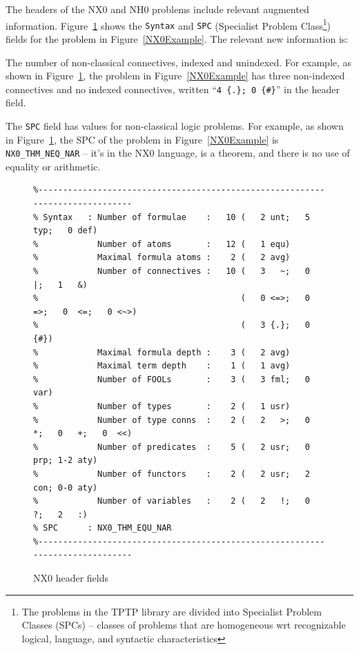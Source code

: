\documentclass{ceurart}
\newenvironment{packed_itemize}{
\vspace*{-0.5em}
\begin{itemize}
\setlength{\partopsep}{0pt}
\setlength{\itemsep}{1pt}
\setlength{\parskip}{0pt}
\setlength{\parsep}{0pt}
}{\end{itemize}}
\begin{document}
The headers of the NX0 and NH0 problems include relevant augmented information.
Figure~\ref{NX0Header} shows the {\tt Syntax} and {\tt SPC} (Specialist Problem Class\footnote{%
The problems in the TPTP library are divided into Specialist Problem Classes (SPCs) – classes 
of problems that are homogeneous wrt recognizable logical, language, and syntactic
characteristics}) fields for the problem in Figure~\ref{NX0Example}.
The relevant new information is:
\begin{packed_itemize}
\item The number of non-classical connectives, indexed and unindexed.
      For example, as shown in Figure~\ref{NX0Header}, the problem in Figure~\ref{NX0Example} 
      has three non-indexed connectives and no indexed connectives, written 
      ``{\tt 4 \{.\};   0 \{\#\}}'' in the header field.
\item The {\tt SPC} field has values for non-classical logic problems. 
      For example, as shown in Figure~\ref{NX0Header}, the SPC of the problem in 
      Figure~\ref{NX0Example} is {\tt NX0\_THM\_NEQ\_NAR} -- it's in the NX0 language, is a 
      theorem, and there is no use of equality or arithmetic.
\end{packed_itemize}

\begin{figure}[h!]
\small
{}
\begin{verbatim}
%------------------------------------------------------------------------------
% Syntax   : Number of formulae    :   10 (   2 unt;   5 typ;   0 def)
%            Number of atoms       :   12 (   1 equ)
%            Maximal formula atoms :    2 (   2 avg)
%            Number of connectives :   10 (   3   ~;   0   |;   1   &)
%                                         (   0 <=>;   0  =>;   0  <=;   0 <~>)
%                                         (   3 {.};   0 {#})
%            Maximal formula depth :    3 (   2 avg)
%            Maximal term depth    :    1 (   1 avg)
%            Number of FOOLs       :    3 (   3 fml;   0 var)
%            Number of types       :    2 (   1 usr)
%            Number of type conns  :    2 (   2   >;   0   *;   0   +;   0  <<)
%            Number of predicates  :    5 (   2 usr;   0 prp; 1-2 aty)
%            Number of functors    :    2 (   2 usr;   2 con; 0-0 aty)
%            Number of variables   :    2 (   2   !;   0   ?;   2   :)
% SPC      : NX0_THM_EQU_NAR
%------------------------------------------------------------------------------
\end{verbatim}
\caption{NX0 header fields}
\label{NX0Header}
\end{figure}
\end{document}
